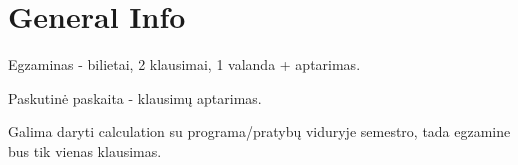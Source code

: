 \section{General Info}

Egzaminas - bilietai, 2 klausimai, 1 valanda + aptarimas. 

Paskutinė paskaita - klausimų aptarimas.

Galima daryti calculation su programa/pratybų viduryje semestro, tada egzamine bus tik vienas klausimas.